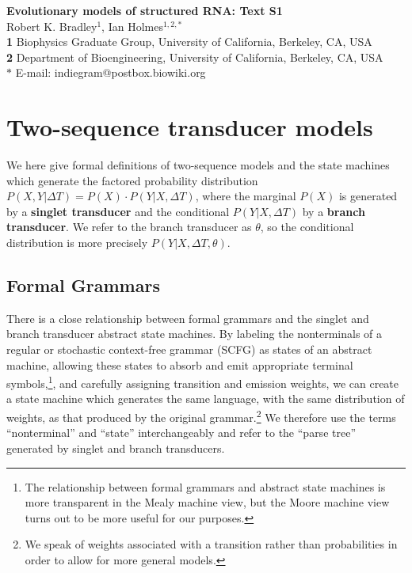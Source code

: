 \documentclass[10pt]{article}
\date{}
\begin{document}
\begin{flushleft}
  {\Large
    \textbf{Evolutionary models of structured RNA: Text S1}
  }
\\
Robert K. Bradley$^{1}$, 
Ian Holmes$^{1,2,\ast}$
\\
\textbf{1} Biophysics Graduate Group, University of California, Berkeley, CA, USA
\\
\textbf{2} Department of Bioengineering, University of California, Berkeley, CA, USA
\\
$\ast$ E-mail: indiegram@postbox.biowiki.org
\end{flushleft}


\newpage
\tableofcontents

\newpage
\section{Two-sequence transducer models}

We here give formal definitions of two-sequence models and the state machines which
generate the factored probability distribution $P (X, Y | \Delta T) = P (X) \cdot P (Y | X, \Delta T)$,
where the marginal $P(X)$ is generated by a {\bf singlet transducer}
and the conditional $P (Y | X, \Delta T)$ by a {\bf branch transducer}.
We refer to the branch transducer as $\theta$, so the conditional distribution
is more precisely $P (Y | X, \Delta T, \theta)$.


\subsection{Formal Grammars} 

There is a close relationship between formal grammars and the singlet and branch transducer abstract state machines.
By labeling the nonterminals of a regular or stochastic context-free grammar (SCFG) as states of an abstract machine, allowing these states to absorb and emit 
appropriate terminal symbols,\footnote{The relationship between formal grammars and abstract state machines is more transparent
in the Mealy machine view, but the Moore machine view turns out to be more useful for our purposes.},
and carefully assigning transition and emission weights,
we can create a state machine which generates the same language, with the same distribution of weights, as that produced by the original grammar.\footnote{We speak of
weights associated with a transition rather than probabilities in order to allow for more general models.}
We therefore use the terms ``nonterminal'' and ``state'' interchangeably
and refer to the ``parse tree'' generated by singlet and branch transducers.
\end{document}
